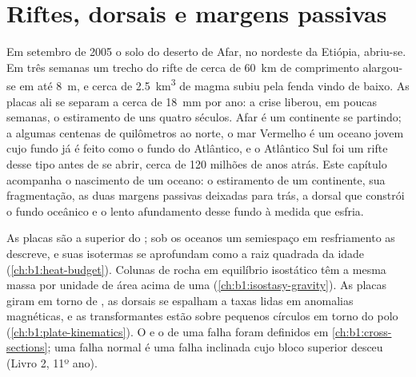\chapter{Riftes, dorsais e margens passivas}\label{ch:b1:rifts-ridges-margins}

Em setembro de 2005 o solo do deserto de Afar, no nordeste da Etiópia, abriu-se. Em três semanas um trecho do rifte de cerca de \qty{60}{km} de comprimento alargou-se em até \qty{8}{m}, e cerca de \qty{2.5}{km^3} de magma subiu pela fenda vindo de baixo. As placas ali se separam a cerca de \qty{18}{mm} por ano: a crise liberou, em poucas semanas, o estiramento de uns quatro séculos. Afar é um continente se partindo; a algumas centenas de quilômetros ao norte, o mar Vermelho é um oceano jovem cujo fundo já é feito como o fundo do Atlântico, e o Atlântico Sul foi um rifte desse tipo antes de se abrir, cerca de 120 milhões de anos atrás. Este capítulo acompanha o nascimento de um oceano: o estiramento de um continente, sua fragmentação, as duas margens passivas deixadas para trás, a dorsal que constrói o fundo oceânico e o lento afundamento desse fundo à medida que esfria.

\begin{recall}
As placas são a  superior do ; sob os oceanos um semiespaço em resfriamento as descreve, e suas isotermas se aprofundam como a raiz quadrada da
idade (\cref{ch:b1:heat-budget}). Colunas de rocha em equilíbrio isostático têm a mesma massa por unidade de área acima de uma 
(\cref{ch:b1:isostasy-gravity}). As placas giram em torno de , as dorsais se espalham a taxas lidas em anomalias magnéticas, e as transformantes estão sobre pequenos círculos em torno do polo (\cref{ch:b1:plate-kinematics}). O  e o  de uma falha foram definidos em \cref{ch:b1:cross-sections}; uma falha normal é uma falha inclinada cujo bloco superior desceu (Livro 2, 11º ano).
\end{recall}

